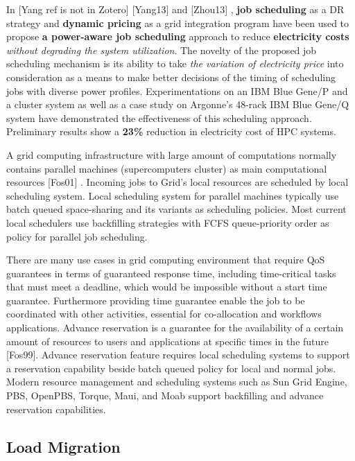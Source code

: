 \documentclass{llncs}
\begin{document}
In 
[Yang ref is not in Zotero] 
\cite{zhou_reducing_2013}
[Yang13] and [Zhou13] , \textbf{job scheduling} as a DR strategy and
\textbf{dynamic pricing} as a grid integration program have been used to
propose \textbf{a power-aware job scheduling} approach to reduce
\textbf{electricity costs} \textit{without degrading the system utilization}. 
The novelty of the proposed job scheduling
mechanism is its ability to take \textit{the variation of 
electricity price }into consideration as a means to make
better decisions of the timing of scheduling jobs with diverse power
profiles. Experimentations on an IBM Blue Gene/P and a cluster system as
well as a case study on Argonne's 48-rack IBM Blue Gene/Q system have
demonstrated the effectiveness of this scheduling approach. Preliminary
results show a \textbf{23{\%}} reduction in electricity cost of HPC systems.

A grid computing infrastructure with large amount of computations normally
contains parallel machines (supercomputers cluster) as main computational
resources 
\cite{foster_anatomy_2001} [Fos01]
. Incoming jobs to Grid's local resources are scheduled by
local scheduling system. Local scheduling system for parallel machines
typically use batch queued space-sharing and its variants as scheduling
policies. Most current local schedulers use backfilling strategies with FCFS
queue-priority order as policy for parallel job scheduling.

There are many use cases in grid computing environment that require QoS
guarantees in terms of guaranteed response time, including time-critical
tasks that must meet a deadline, which would be impossible without a start
time guarantee. Furthermore providing time guarantee enable the job to be
coordinated with other activities, essential for co-allocation and workflows
applications. Advance reservation is a guarantee for the availability of a
certain amount of resources to users and applications at specific times in
the future 
\cite{foster_distributed_1999} [Fos99]. Advance reservation feature requires local scheduling
systems to support a reservation capability beside batch queued policy for
local and normal jobs. Modern resource management
and scheduling systems such as Sun Grid Engine, PBS, OpenPBS, Torque, Maui,
and Moab support backfilling and advance reservation capabilities.

\subsection{Load Migration}
\end{document}
